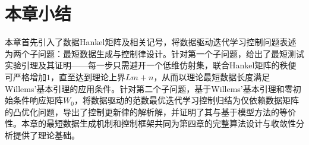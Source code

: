 \section{本章小结}

本章首先引入了数据Hankel矩阵及相关记号，将数据驱动迭代学习控制问题表述为两个子问题：最短数据生成与控制律设计。针对第一个子问题，给出了最短测试实验引理及其证明——每一步只需避开一个低维仿射集，联合Hankel矩阵的秩便可严格增加$1$，直至达到理论上界$Lm+n$，从而以理论最短数据长度满足Willems'基本引理的应用条件。针对第二个子问题，基于Willems'基本引理和零初始条件响应矩阵$W_0$，将数据驱动的范数最优迭代学习控制归结为仅依赖数据矩阵的凸优化问题，导出了控制更新律的解析解，并证明了其与基于模型方法的等价性。本章的最短数据生成机制和控制框架共同为第四章的完整算法设计与收敛性分析提供了理论基础。